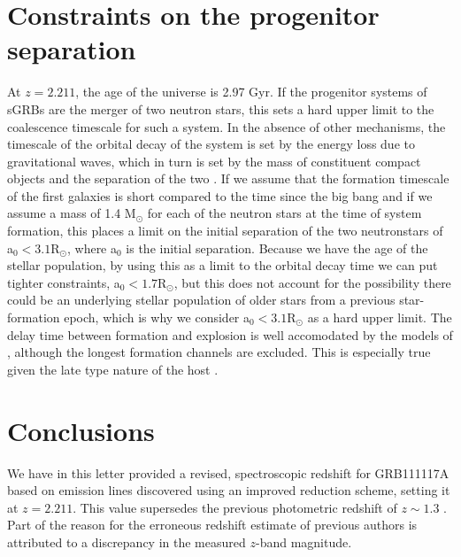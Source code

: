 \documentclass{aa}    %
\begin{document}
\section{Constraints on the progenitor separation}

At $z = 2.211$, the age of the universe is 2.97 Gyr. If the progenitor systems of sGRBs are the merger of two neutron stars, this sets a hard upper limit to the coalescence timescale for such a system. In the absence of other mechanisms, the timescale of the orbital decay of the system is set by the energy loss due to gravitational waves, which in turn is set by the mass of constituent compact objects and the separation of the two \citep{Postnov2014}. If we assume that the formation timescale of the first galaxies is short compared to the time since the big bang \citep{Richard2011} and if we assume a mass of 1.4 M$_\odot$ for each of the neutron stars at the time of system formation, this places a limit on the initial separation of the two neutronstars of a$_0 < 3.1 $R$_\odot$, where a$_0$ is the initial separation. Because we have the age of the stellar population, by using this as a limit to the orbital decay time we can put tighter constraints, a$_0 < 1.7 $R$_\odot$, but this does not account for the possibility there could be an underlying stellar population of older stars from a previous star-formation epoch, which is why we consider a$_0 < 3.1 $R$_\odot$ as a hard upper limit. The delay time between formation and explosion is well accomodated by the models of \citet{Belczynski2006}, although the longest formation channels are excluded. This is especially true given the late type nature of the host \citep{OShaughnessy2008}.

\section{Conclusions}

We have in this letter provided a revised, spectroscopic redshift for GRB111117A based on emission lines discovered using an improved reduction scheme, setting it at $z = 2.211$. This value supersedes the previous photometric redshift of $z \sim 1.3$ \citep{Margutti2012, Sakamoto2013}. Part of the reason for the erroneous redshift estimate of previous authors is attributed to a discrepancy in the measured $z$-band magnitude. 
\end{document}
